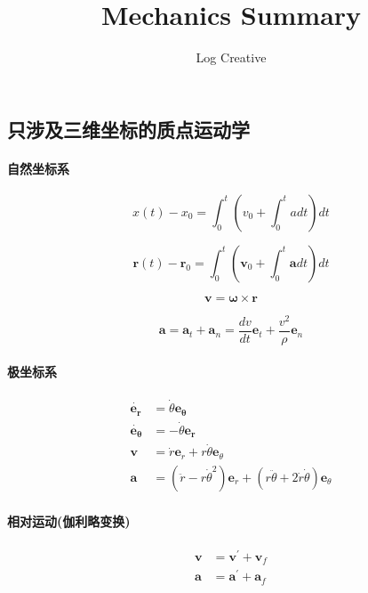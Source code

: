 \documentclass[12pt,a4paper]{article}
\numberwithin{equation}{section}
\begin{document}
\begin{CJK}{UTF8}{gbsn} %

\title{Mechanics Summary}
\author{Log Creative}
\date{}
\maketitle

\section{只涉及三维坐标的质点运动学}
\paragraph{自然坐标系}

\begin{equation}
  x(t)-x_0=\int_0^t \left( v_0 + \int_0^t a dt \right)dt
\end{equation}

\begin{equation}
  \bm{r}(t)-\bm{r}_0=\int_0^t \left( \bm{v}_0 + \int_0^t \bm{a} dt \right)dt
\end{equation}

\begin{equation}
  \bm{v}=\bm{\omega}\times \bm{r}
\end{equation}

\begin{equation}
  \bm{a}=\bm{a}_t+\bm{a}_n=\frac{dv}{dt}\bm{e}_t+\frac{v^2}{\rho} \bm{e}_n
\end{equation}

\paragraph{极坐标系}

\begin{align}
  \dot{\bm{e_r}}&=\dot{\theta}\bm{e_{\theta}} \\
  \dot{\bm{e_{\theta}}}&=- \dot{\theta}\bm{e_r} \\
  \bm{v}&=\dot{r} \bm{e}_r +r \dot{\theta} \bm{e}_{\theta} \\
  \bm{a}&=\left(\ddot{r}-r\dot{\theta}^2\right)\bm{e}_r+\left( r \ddot{\theta}+2 \dot{r} \dot{\theta} \right)\bm{e}_{\theta}
\end{align}

\paragraph{相对运动(伽利略变换)}
\begin{align}
  \bm{v} & =\bm{v}^{\prime}+\bm{v}_f \\
  \bm{a} & =\bm{a}^{\prime}+\bm{a}_f
\end{align}


\end{CJK}
\end{document}
